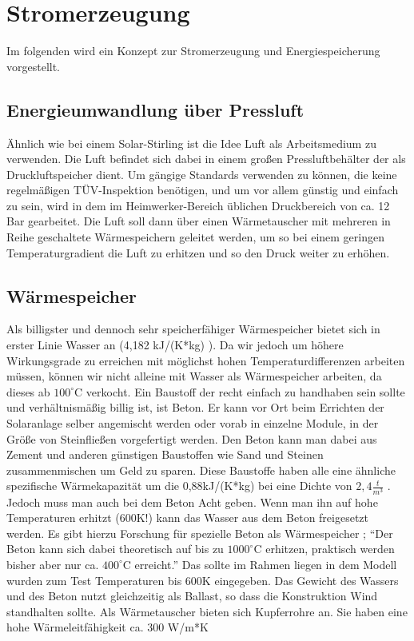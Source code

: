 \documentclass[fontsize=10pt,paper=a4,bibliography=totoc]{scrartcl}
\begin{document}
\section{Stromerzeugung}
Im folgenden wird ein Konzept zur Stromerzeugung und Energiespeicherung vorgestellt.
\subsection{Energieumwandlung über Pressluft}
Ähnlich wie bei einem Solar-Stirling ist die Idee Luft als Arbeitsmedium zu verwenden.
Die Luft befindet sich dabei in einem großen Pressluftbehälter der als Druckluftspeicher dient. Um gängige Standards verwenden zu können, die keine regelmäßigen TÜV-Inspektion benötigen, und um vor allem günstig und einfach zu sein, wird in dem im Heimwerker-Bereich üblichen Druckbereich von ca. 12 Bar gearbeitet.
Die Luft soll dann über einen Wärmetauscher mit mehreren in Reihe geschaltete Wärmespeichern geleitet werden, um so bei einem geringen Temperaturgradient die Luft zu erhitzen und so den Druck weiter zu erhöhen.

\subsection{Wärmespeicher}
Als billigster und dennoch sehr speicherfähiger Wärmespeicher bietet sich in erster Linie Wasser an (4,182 kJ/(K*kg) ). Da wir jedoch um höhere Wirkungsgrade zu erreichen mit möglichst hohen Temperaturdifferenzen arbeiten müssen, können wir nicht alleine mit Wasser als Wärmespeicher arbeiten, da dieses ab $100^\circ$C verkocht.
Ein Baustoff der recht einfach zu handhaben sein sollte und verhältnismäßig billig ist, ist Beton. Er kann vor Ort beim Errichten der Solaranlage selber angemischt werden oder vorab in einzelne Module, in der Größe von Steinfließen vorgefertigt werden.
Den Beton kann man dabei aus Zement und anderen günstigen Baustoffen wie Sand und Steinen zusammenmischen um Geld zu sparen. Diese Baustoffe haben alle eine ähnliche spezifische Wärmekapazität um die 0,88kJ/(K*kg) bei eine Dichte von $2,4\frac{t}{m^3}$ \cite{waerme}.
Jedoch muss man auch bei dem Beton Acht geben. Wenn man ihn auf hohe Temperaturen erhitzt (600K!) kann das Wasser aus dem Beton freigesetzt werden. Es gibt hierzu Forschung für spezielle Beton als Wärmespeicher  \cite{speicher}  \cite{beton};
“Der Beton kann sich dabei theoretisch auf bis zu $1000^\circ$C erhitzen, praktisch werden bisher aber nur ca. $400^\circ$C erreicht.”
Das sollte im Rahmen liegen in dem Modell wurden zum Test Temperaturen bis 600K eingegeben.
Das Gewicht des Wassers und des Beton nutzt gleichzeitig als Ballast, so dass die Konstruktion Wind standhalten sollte.
Als Wärmetauscher bieten sich Kupferrohre an. Sie haben eine hohe Wärmeleitfähigkeit ca. 300 W/m*K
\end{document}

